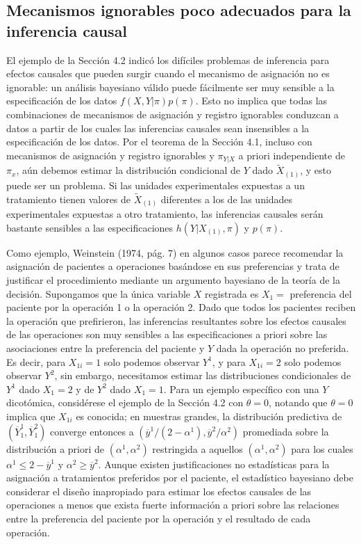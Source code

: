 \documentclass[12pt,a4paper]{article}
\begin{document}
\subsection{Mecanismos ignorables poco adecuados para la inferencia causal}

El ejemplo de la Sección 4.2 indicó los difíciles problemas de inferencia para efectos causales que pueden surgir cuando el mecanismo de asignación no es ignorable: un análisis bayesiano válido puede fácilmente ser muy sensible a la especificación de los datos $f(X,Y|\pi)p(\pi)$. Esto no implica que todas las combinaciones de mecanismos de asignación y registro ignorables conduzcan a datos a partir de los cuales las inferencias causales sean insensibles a la especificación de los datos. Por el teorema de la Sección 4.1, incluso con mecanismos de asignación y registro ignorables y $\pi_{Y|X}$ a priori independiente de $\pi_x$, aún debemos estimar la distribución condicional de $Y$ dado $\tilde{X}_{(1)}$, y esto puede ser un problema. Si las unidades experimentales expuestas a un tratamiento tienen valores de $\tilde{X}_{(1)}$ diferentes a los de las unidades experimentales expuestas a otro tratamiento, las inferencias causales serán bastante sensibles a las especificaciones $h(Y|X_{(1)},\pi)$ y $p(\pi)$. 

Como ejemplo, Weinstein (1974, pág. 7) en algunos casos parece recomendar la asignación de pacientes a operaciones basándose en sus preferencias y trata de justificar el procedimiento mediante un argumento bayesiano de la teoría de la decisión. Supongamos que la única variable $X$ registrada es $X_1 =$ preferencia del paciente por la operación 1 o la operación 2. Dado que todos los pacientes reciben la operación que prefirieron, las inferencias resultantes sobre los efectos causales de las operaciones son muy sensibles a las especificaciones a priori sobre las asociaciones entre la preferencia del paciente y $Y$ dada la operación no preferida. Es decir, para $X_{1i}=1$ solo podemos observar $Y^1$, y para $X_{1i}=2$ solo podemos observar $Y^2$, sin embargo, necesitamos estimar las distribuciones condicionales de $Y^1$ dado $X_1=2$ y de $Y^2$ dado $X_1=1$. Para un ejemplo específico con una $Y$ dicotómica, considérese el ejemplo de la Sección 4.2 con $\theta=0$, notando que $\theta=0$ implica que $X_{1i}$ es conocida; en muestras grandes, la distribución predictiva de $(\overline{Y}_1^1, \overline{Y}_1^2)$ converge entonces a $(\overline{y}^1/(2-\alpha^1), \overline{y}^2/\alpha^2)$ promediada sobre la distribución a priori de $(\alpha^1, \alpha^2)$ restringida a aquellos $(\alpha^1, \alpha^2)$ para los cuales $\alpha^1 \le 2-\overline{y}^1$ y $\alpha^2 \ge \overline{y}^2$. Aunque existen justificaciones no estadísticas para la asignación a tratamientos preferidos por el paciente, el estadístico bayesiano debe considerar el diseño inapropiado para estimar los efectos causales de las operaciones a menos que exista fuerte información a priori sobre las relaciones entre la preferencia del paciente por la operación y el resultado de cada operación. 
\end{document}
